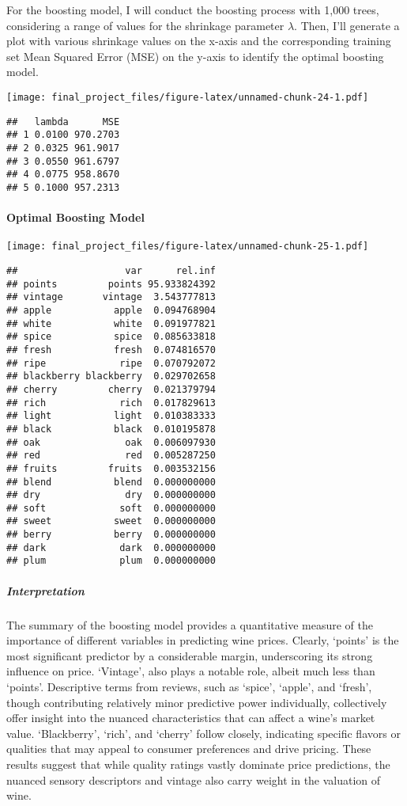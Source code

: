 \documentclass[
]{article}
\begin{document}
For the boosting model, I will conduct the boosting process with 1,000
trees, considering a range of values for the shrinkage parameter
\(\lambda\). Then, I'll generate a plot with various shrinkage values on
the x-axis and the corresponding training set Mean Squared Error (MSE)
on the y-axis to identify the optimal boosting model.

\texttt{[image: final\_project\_files/figure-latex/unnamed-chunk-24-1.pdf]}

\begin{verbatim}
##   lambda      MSE
## 1 0.0100 970.2703
## 2 0.0325 961.9017
## 3 0.0550 961.6797
## 4 0.0775 958.8670
## 5 0.1000 957.2313
\end{verbatim}

\hypertarget{optimal-boosting-model}{%
\paragraph{Optimal Boosting Model}\label{optimal-boosting-model}}

\texttt{[image: final\_project\_files/figure-latex/unnamed-chunk-25-1.pdf]}

\begin{verbatim}
##                   var      rel.inf
## points         points 95.933824392
## vintage       vintage  3.543777813
## apple           apple  0.094768904
## white           white  0.091977821
## spice           spice  0.085633818
## fresh           fresh  0.074816570
## ripe             ripe  0.070792072
## blackberry blackberry  0.029702658
## cherry         cherry  0.021379794
## rich             rich  0.017829613
## light           light  0.010383333
## black           black  0.010195878
## oak               oak  0.006097930
## red               red  0.005287250
## fruits         fruits  0.003532156
## blend           blend  0.000000000
## dry               dry  0.000000000
## soft             soft  0.000000000
## sweet           sweet  0.000000000
## berry           berry  0.000000000
## dark             dark  0.000000000
## plum             plum  0.000000000
\end{verbatim}

\hypertarget{interpretation-1}{%
\subparagraph{Interpretation}\label{interpretation-1}}

The summary of the boosting model provides a quantitative measure of the
importance of different variables in predicting wine prices. Clearly,
`points' is the most significant predictor by a considerable margin,
underscoring its strong influence on price. `Vintage', also plays a
notable role, albeit much less than `points'. Descriptive terms from
reviews, such as `spice', `apple', and `fresh', though contributing
relatively minor predictive power individually, collectively offer
insight into the nuanced characteristics that can affect a wine's market
value. `Blackberry', `rich', and `cherry' follow closely, indicating
specific flavors or qualities that may appeal to consumer preferences
and drive pricing. These results suggest that while quality ratings
vastly dominate price predictions, the nuanced sensory descriptors and
vintage also carry weight in the valuation of wine.
\end{document}
